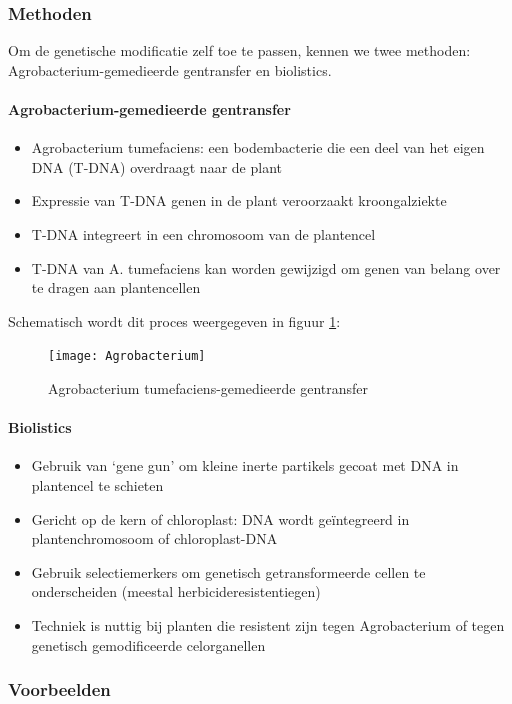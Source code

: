 \documentclass[a4paper,kul]{kulakarticle} %
\begin{document}
\subsubsection{Methoden}
Om de genetische modificatie zelf toe te passen, kennen we twee methoden: Agrobacterium-gemedieerde gentransfer en biolistics.
\paragraph{Agrobacterium-gemedieerde gentransfer}
\begin{itemize}
	\item Agrobacterium tumefaciens: een bodembacterie die een deel van het
	eigen DNA (T-DNA) overdraagt naar de plant
	\item Expressie van T-DNA genen in de plant veroorzaakt kroongalziekte
	\item T-DNA integreert in een chromosoom van de plantencel
	\item T-DNA van A. tumefaciens kan worden gewijzigd om genen van
	belang over te dragen aan plantencellen
\end{itemize}
Schematisch wordt dit proces weergegeven in figuur \ref{fig:agrobacterium}:
\begin{figure}[!htbp]
	\centering
	\texttt{[image: Agrobacterium]}
	\caption[Agro bacerium]{Agrobacterium tumefaciens-gemedieerde gentransfer}
	\label{fig:agrobacterium}
\end{figure}
\paragraph{Biolistics}
\begin{itemize}
	\item Gebruik van `gene gun' om kleine inerte partikels
	gecoat met DNA in plantencel te schieten
	\item Gericht op de kern of chloroplast: DNA wordt
	geïntegreerd in plantenchromosoom of chloroplast-DNA
	\item Gebruik selectiemerkers om genetisch getransformeerde cellen te
	onderscheiden (meestal herbicideresistentiegen)
	\item Techniek is nuttig bij planten die resistent zijn
	tegen Agrobacterium of tegen genetisch
	gemodificeerde celorganellen
\end{itemize}
\subsubsection{Voorbeelden}
\end{document}
